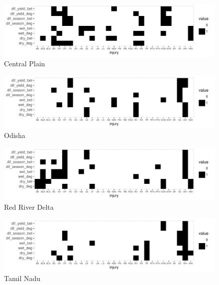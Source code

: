 \begin{landscape}
\begin{figure}
\centering
\includegraphics[height = 0.4\textwidth]{figures/sum_mat_CP.pdf}
\caption{Central Plain}
\end{figure}    
\begin{figure}
\centering
\includegraphics[height = 0.4\textwidth]{figures/sum_mat_OD.pdf}
\caption{Odisha}
\end{figure}    
\end{landscape} 

\begin{landscape}
\begin{figure}
\centering
\includegraphics[height = 0.4\textwidth]{figures/sum_mat_RR.pdf}
\caption{Red River Delta}
\end{figure}    
\begin{figure}
\centering
\includegraphics[height = 0.4\textwidth]{figures/sum_mat_TM.pdf}
\caption{Tamil Nadu}
\end{figure}    
\end{landscape} 

